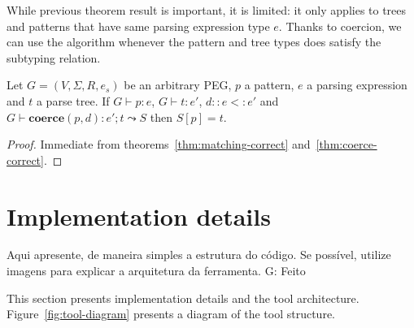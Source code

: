 While previous theorem result is important, it is limited: it only applies to
trees and patterns that have same parsing expression type $e$. Thanks to coercion,
we can use the algorithm whenever the pattern and tree types does satisfy the
subtyping relation.

\begin{corollary}
Let $G = (V,\Sigma,R, e_s)$ be an arbitrary PEG, $p$ a pattern,
$e$ a parsing expression and $t$ a parse tree. If $G \vdash p : e$, $G \vdash t : e'$,
  $d :: e <: e'$ and $G\vdash \mathbf{coerce}(p,d) : e' ; t \leadsto S$ then $S[p] = t$.
\end{corollary}
\begin{proof}
  Immediate from theorems~\ref{thm:matching-correct} and~\ref{thm:coerce-correct}.
\end{proof}

\section{Implementation details}\label{sec:implementation-details}

Aqui apresente, de maneira simples a estrutura do código. Se possível, utilize imagens para
explicar a arquitetura da ferramenta.
G: Feito 

This section presents implementation details and the tool architecture. 
Figure~\ref{fig:tool-diagram} presents a diagram of the tool structure.

